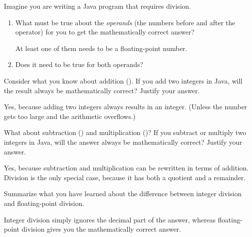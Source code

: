 \Q Imagine you are writing a Java program that requires division.

\begin{enumerate}[itemsep=1ex]

\item What must be true about the \emph{operands} (the numbers before and after the operator) for you to get the mathematically correct answer?

\begin{answer}[1em]
At least one of them needs to be a floating-point number.
\end{answer}

\item Does it need to be true for both operands? 

\end{enumerate}


\Q Consider what you know about addition (\java{+}).
If you add two integers in Java, will the result always be mathematically correct?
Justify your answer.

\begin{answer}
Yes, because adding two integers always results in an integer.
(Unless the number gets too large and the arithmetic overflows.)
\end{answer}


\Q What about subtraction (\java{-}) and multiplication (\java{*})? If you subtract or multiply two integers in Java, will the answer always be mathematically correct? Justify your answer.

\begin{answer}
Yes, because subtraction and multiplication can be rewritten in terms of addition.
Division is the only special case, because it has both a quotient and a remainder.
\end{answer}


\Q \label{intdiv}
Summarize what you have learned about the difference between integer division and floating-point division.

\begin{answer}
Integer division simply ignores the decimal part of the answer, whereas floating-point division gives you the mathematically correct answer.
\end{answer}
